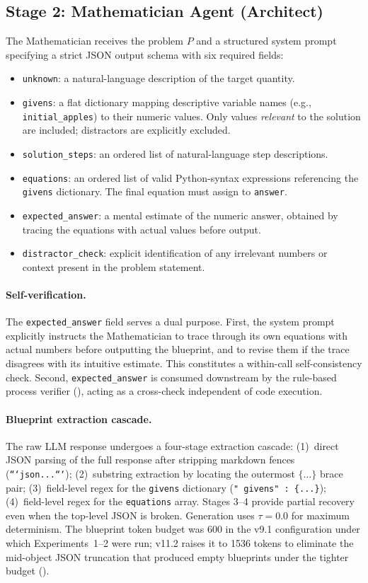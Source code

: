 \documentclass[11pt,a4paper]{article}
\begin{document}
\subsection{Stage 2: Mathematician Agent (Architect)}
\label{sec:mathematician}
The Mathematician receives the problem $P$ and a structured system prompt specifying a strict JSON output schema with six required fields:
\begin{itemize}[leftmargin=*,itemsep=2pt]
    \item \texttt{unknown}: a natural-language description of the target quantity.
    \item \texttt{givens}: a flat dictionary mapping descriptive variable names (e.g., \texttt{initial\_apples}) to their numeric values. Only values \emph{relevant} to the solution are included; distractors are explicitly excluded.
    \item \texttt{solution\_steps}: an ordered list of natural-language step descriptions.
    \item \texttt{equations}: an ordered list of valid Python-syntax expressions referencing the \texttt{givens} dictionary. The final equation must assign to \texttt{answer}.
    \item \texttt{expected\_answer}: a mental estimate of the numeric answer, obtained by tracing the equations with actual values before output.
    \item \texttt{distractor\_check}: explicit identification of any irrelevant numbers or context present in the problem statement.
\end{itemize}
\paragraph{Self-verification.}
The \texttt{expected\_answer} field serves a dual purpose.
First, the system prompt explicitly instructs the Mathematician to trace through its own equations with actual numbers before outputting the blueprint, and to revise them if the trace disagrees with its intuitive estimate.
This constitutes a within-call self-consistency check.
Second, \texttt{expected\_answer} is consumed downstream by the rule-based process verifier (), acting as a cross-check independent of code execution.
\paragraph{Blueprint extraction cascade.}
The raw LLM response undergoes a four-stage extraction cascade:
(1)~direct JSON parsing of the full response after stripping markdown fences (\texttt{```json...```});
(2)~substring extraction by locating the outermost $\{\ldots\}$ brace pair;
(3)~field-level regex for the \texttt{givens} dictionary (\texttt{"\,givens"\,:\,\{...\}});
(4)~field-level regex for the \texttt{equations} array.
Stages 3--4 provide partial recovery even when the top-level JSON is broken.
Generation uses $\tau=0.0$ for maximum determinism. The blueprint token budget was 600 in the v9.1 configuration under which Experiments~1--2 were run; v11.2 raises it to 1536 tokens to eliminate the mid-object JSON truncation that produced empty blueprints under the tighter budget ().
\end{document}
